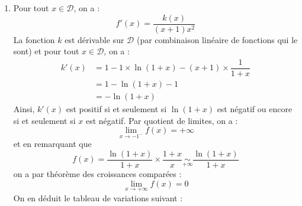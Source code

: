 \documentclass[a4paper,11pt]{report}
\begin{document}
\begin{enumerate}
\item Pour tout $x \in \mathcal{D}$, on a :
$$ f'(x) = \dfrac{k(x)}{(x+1)x^2}$$
La fonction $k$ est dérivable sur $\mathcal{D}$ (par combinaison linéaire de fonctions qui le sont) et pour tout $x \in \mathcal{D}$, on a :
\begin{align*}
k'(x) & = 1 - 1 \times \ln(1+x)-(x+1) \times \dfrac{1}{1+x} \\
& = 1 - \ln(1+x) - 1 \\
& = - \ln(1+x)
\end{align*}
Ainsi, $k'(x)$ est positif si et seulement si $\ln(1+x)$ est négatif ou encore si et seulement si $x$ est négatif. Par quotient de limites, on a :
$$ \lim_{x \rightarrow -1^{-}} f(x)= + \infty$$
et en remarquant que 
$$ f(x) = \dfrac{\ln(1+x)}{1+x} \times \dfrac{1+x}{x} \underset{+ \infty}{\sim} \dfrac{\ln(1+x)}{1+x}$$
on a par théorème des croissances comparées :
$$ \lim_{x \rightarrow + \infty} f(x) = 0$$
On en déduit le tableau de variations suivant :

\begin{center}
\end{center}
\end{enumerate}

\medskip

\begin{center}
\end{center}

\medskip
\end{document}
